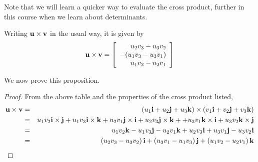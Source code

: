 Note that we will learn a quicker way to evaluate the cross product, further in this course when we learn about determinants.

Writing ${\bf u} \times {\bf v}$ in the usual way, it is given by 
\begin{equation*}
{\bf u} \times {\bf v}
=
\left[
\begin{array}{r}
 u_{2}v_{3}-u_{3}v_{2} \\
-(u_{1}v_{3}-u_{3}v_{1}) \\
 u_{1}v_{2}-u_{2}v_{1}
\end{array}
\right]
\end{equation*}

We now prove this proposition. 

\begin{proof} From the above table and the properties of the cross
product listed,
\begin{eqnarray*}
{\bf u} \times {\bf v} &=& \left( u_{1}{\bf i}+u_{2}{\bf j}+u_{3}{\bf k}\right) \times \left(
v_{1}{\bf i}+v_{2}{\bf j}+v_{3}{\bf k}\right) \\
&=& u_{1}v_{2}{\bf i}\times {\bf j}+u_{1}v_{3}{\bf i}\times {\bf k}+u_{2}v_{1}{\bf j}\times {\bf i}+
u_{2}v_{3}{\bf j}\times {\bf k}+
+u_{3}v_{1}{\bf k}\times {\bf i}+u_{3}v_{2}{\bf k}\times {\bf j} \\
&=&u_{1}v_{2}{\bf k}-u_{1}v_{3}{\bf j}-u_{2}v_{1}{\bf k}+u_{2}v_{3}
{\bf i}+u_{3}v_{1}{\bf j}-u_{3}v_{2}{\bf i} \\
&=&\left( u_{2}v_{3}-u_{3}v_{2}\right) {\bf i}+\left(
u_{3}v_{1}-u_{1}v_{3}\right) {\bf j}+\left( u_{1}v_{2}-u_{2}v_{1}\right)
{\bf k}  
\end{eqnarray*}
\begin{equation}
\label{crossprod2}
\end{equation}
\end{proof}

